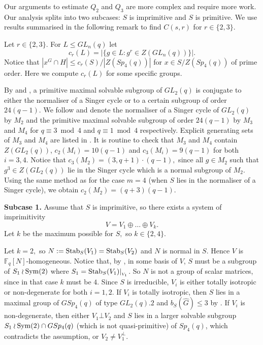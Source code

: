  Our arguments  to estimate $Q_2$ and $Q_3$ are more complex and require more work. Our analysis splits into two subcases: $S$ is imprimitive and $S$ is primitive. We use results summarised in the following remark to find $C(s,r)$ for $r \in \{2,3\}.$

\medskip

\begin{Rem}\label{remmi}
Let $r\in \{2,3\}$. For  $L \le GL_n(q)$ let $$c_r(L)=|\{g \in L : g^r \in Z(GL_n(q))\}|.$$ Notice that $|x^G \cap H| \le c_r(S)/|Z(Sp_4(q))|$ for $x \in S/Z(Sp_4(q))$ of prime order. Here we compute $c_r(L)$ for some specific groups.  

By \cite[\S21, Theorem 6]{sup} and \cite[Chapter 5]{short}, a primitive maximal solvable subgroup of $GL_2(q)$ is conjugate to either the normaliser of a Singer cycle or to a certain subgroup of order $24(q-1).$ We follow \cite[Chapter 5]{short} and denote the normaliser of a Singer cycle of $GL_2(q)$ by $M_2$ and the primitive maximal solvable subgroup of order $24(q-1)$ by   $M_3$ and $M_4$ for $q \equiv 3 \bmod 4$ and $q \equiv 1 \bmod {4}$ respectively.  Explicit generating sets of $M_3$ and $M_4$ are listed in \cite[\S 5.2]{short}. It is routine to check that $M_3$ and $M_4$ contain $Z(GL_2(q))$, $c_2(M_i)=10(q-1)$ and $c_3(M_i)=9(q-1)$ for both $i=3,4.$ Notice that $c_3(M_2)=(3,q+1) \cdot (q-1),$ since all  $g \in M_2$ such that $g^3 \in Z(GL_2(q))$ lie in the Singer cycle which is a normal subgroup of $M_2.$ Using the same method as for the case $m=4$ (when $S$ lies in the normaliser of a Singer cycle), we obtain $c_2(M_2)=(q+3)(q-1)$.
\end{Rem}

\bigskip

{\bf Subcase 1.} Assume that $S$ is imprimitive, so there exists a system of imprimitivity
$$V=V_1 \oplus \ldots \oplus V_k.$$ Let $k$ be the maximum possible for $S,$ so $k \in \{2,4\}.$

Let $k=2,$ so $N:=\mathrm{Stab}_S(V_1)=\mathrm{Stab}_S(V_2)$ and $N$ is normal in $S$. Hence $V$ is $\mathbb{F}_q[N]$-homogeneous. Notice that, by \cite[\S 15, Lemma 5]{sup}, in some basis of $V$, $S$ must be a subgroup of $S_1 \wr \mathrm{Sym}(2)$ where $S_1=\mathrm{Stab}_S(V_1)|_{_{V_1}}$. So $N$ is not a group of scalar matrices, since in that case $k$ must be $4.$ Since $S$ is irreducible, $V_i$ is either totally isotropic  or non-degenerate  for both $i=1,2.$  If $V_i$ is totally isotropic, then $S$ lies in a maximal group of $GSp_4(q)$ of type $GL_2(q).2$ and $b_S(\hat{G}) \le 3$ by  \cite[Table 2]{burness}. If $V_i$ is non-degenerate, then  either $V_1 \bot V_2$ and  $S$ lies in a larger solvable subgroup $S_1 \wr \mathrm{Sym}(2) \cap GSp_4(q)$ (which is not quasi-primitive) of $Sp_4(q)$, which contradicts the assumption, or $V_2 \ne V_1^{\bot}.$

